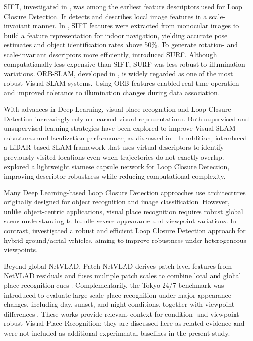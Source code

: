 \documentclass{ieeeaccess}
\newenvironment{revisionblock}
{%
  \par
  \begingroup
  \setlength{\fboxsep}{1pt}%
  \setlength{\OuterFrameSep}{0pt}%
  \def\FrameCommand##1{%
    \colorbox{white}{\color{revisionred}##1}%
  }%
  \MakeFramed{%
    \advance\hsize-2\fboxsep
    \FrameRestore
  }%
}
{%
  \endMakeFramed
  \endgroup
  \par
}
\renewenvironment{revisionblock}
  {\par\begingroup\color{revisionred}}
  {\par\endgroup}
\begin{document}
SIFT, investigated in \cite{Lowe2004SIFT}, was among the earliest feature descriptors used for Loop Closure Detection. It detects and describes local image features in a scale-invariant manner. In \cite{Ali2010SIFTMonocularSLAM}, SIFT features were extracted from monocular images to build a feature representation for indoor navigation, yielding accurate pose estimates and object identification rates above 50\%. To generate rotation- and scale-invariant descriptors more efficiently, \cite{Bay2006SURF} introduced SURF. Although computationally less expensive than SIFT, SURF was less robust to illumination variations. ORB-SLAM, developed in \cite{Naseer2015RobustVisualSLAMAcrossSeasons}, is widely regarded as one of the most robust Visual SLAM systems. Using ORB features enabled real-time operation and improved tolerance to illumination changes during data association.

With advances in Deep Learning, visual place recognition and Loop Closure Detection increasingly rely on learned visual representations. Both supervised and unsupervised learning strategies have been explored to improve Visual SLAM robustness and localization performance, as discussed in \cite{Kazerouni2022VisualSLAMSurvey}. In addition, \cite{Song2025VSSLAM} introduced a LiDAR-based SLAM framework that uses virtual descriptors to identify previously visited locations even when trajectories do not exactly overlap. \cite{zhou2025siamesecapsule} explored a lightweight siamese capsule network for Loop Closure Detection, improving descriptor robustness while reducing computational complexity.

Many Deep Learning-based Loop Closure Detection approaches use architectures originally designed for object recognition and image classification. However, unlike object-centric applications, visual place recognition requires robust global scene understanding to handle severe appearance and viewpoint variations. In contrast, \cite{wang2023hybrid} investigated a robust and efficient Loop Closure Detection approach for hybrid ground/aerial vehicles, aiming to improve robustness under heterogeneous viewpoints.

\begin{revisionblock}
Beyond global NetVLAD, Patch-NetVLAD derives patch-level features from NetVLAD residuals and fuses multiple patch scales to combine local and global place-recognition cues \cite{Hausler2021PatchNetVLAD}. Complementarily, the Tokyo 24/7 benchmark was introduced to evaluate large-scale place recognition under major appearance changes, including day, sunset, and night conditions, together with viewpoint differences \cite{Torii2015Tokyo247}. These works provide relevant context for condition- and viewpoint-robust Visual Place Recognition; they are discussed here as related evidence and were not included as additional experimental baselines in the present study.
\end{revisionblock}
\end{document}
